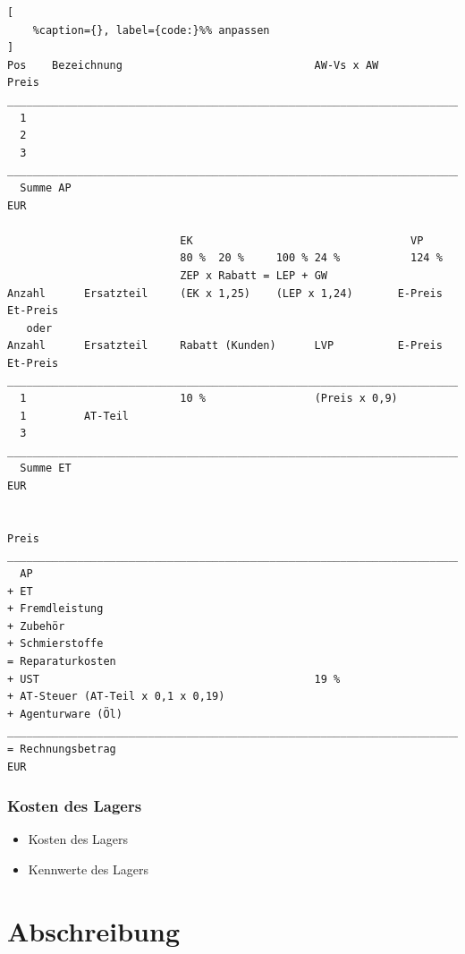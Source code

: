 \lstset{language=Python}%
\begin{lstlisting}[
	%caption={}, label={code:}%% anpassen
]
Pos    Bezeichnung                              AW-Vs x AW           Preis
_____________________________________________________________________________
  1
  2
  3
_____________________________________________________________________________
  Summe AP                                                                EUR

                           EK                                  VP
                           80 %  20 %     100 % 24 %           124 %
                           ZEP x Rabatt = LEP + GW                      
Anzahl      Ersatzteil     (EK x 1,25)    (LEP x 1,24)       E-Preis Et-Preis
   oder
Anzahl      Ersatzteil     Rabatt (Kunden)      LVP          E-Preis Et-Preis
_____________________________________________________________________________
  1                        10 %                 (Preis x 0,9)
  1         AT-Teil
  3
_____________________________________________________________________________
  Summe ET                                                                EUR

                                                                     Preis
_____________________________________________________________________________
  AP
+ ET
+ Fremdleistung
+ Zubehör
+ Schmierstoffe
= Reparaturkosten 
+ UST                                           19 % 
+ AT-Steuer (AT-Teil x 0,1 x 0,19)
+ Agenturware (Öl)
_____________________________________________________________________________
= Rechnungsbetrag                                                         EUR
\end{lstlisting}

\newpage

\subsubsection{Kosten des Lagers}\label{kosten-des-lagers}

\begin{itemize}
\item
  Kosten des Lagers
\item
  Kennwerte des Lagers
\end{itemize}

\newpage

\section{Abschreibung}\label{abschreibung}

